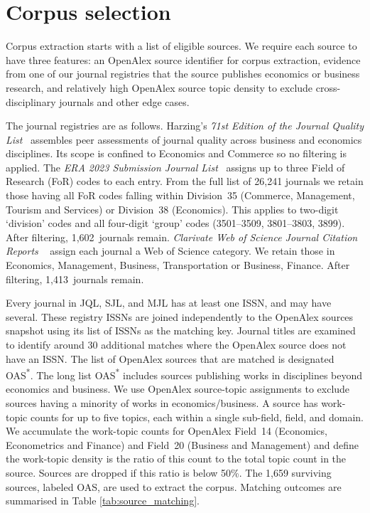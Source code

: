 \section{Corpus selection}
\label{sec:sources}

Corpus extraction starts with a list of eligible sources. We require each source to have three features: an OpenAlex source identifier for corpus extraction, evidence from one of our journal registries that the source 
publishes economics or business research, and relatively high OpenAlex source topic density to exclude cross-disciplinary journals and other edge cases.

The journal registries are as follows. Harzing's \textit{71st Edition of the Journal Quality List}~\cite[][JQL]{harzinga.-w.JournalQualityList2024} assembles
peer assessments of journal quality across business and economics
disciplines. Its scope is confined to Economics and Commerce so no
filtering is applied.
The \textit{ERA 2023 Submission Journal List}~\cite[][SJL]{australianresearchcouncilERA2023Submission2022} assigns up to three
Field of Research (FoR) codes to each entry. From the full list 
of 26,241 journals we retain those having all FoR codes falling within 
Division~35 (Commerce, Management, Tourism and
Services) or Division~38 (Economics). This applies to two-digit `division' codes and all four-digit `group' codes (3501--3509, 3801--3803, 3899).
After filtering, 1,602~journals remain.
\textit{Clarivate Web of Science Journal Citation Reports} ~\cite[][JCR]{clarivateanalyticsJournalCitationReports2026} assign each
journal a Web of Science category. We retain those in Economics, Management, Business, Transportation or Business, Finance. After filtering, 1,413~journals remain.

Every journal in JQL, SJL, and MJL has at least one ISSN, and may have several. These registry ISSNs are joined independently to the OpenAlex sources snapshot using its list of ISSNs as the matching key. Journal titles are examined to identify around 30 additional matches where the OpenAlex source does not have an ISSN. The list of OpenAlex sources that are matched is designated OAS\textsuperscript{*}. The long list OAS\textsuperscript{*} includes sources publishing works in disciplines beyond  economics and business. We use OpenAlex source-topic assignments to exclude sources having a minority of works in economics/business. A source has work-topic counts for up to five topics, each within a single sub-field, field, and domain. We accumulate the work-topic counts for OpenAlex Field~14 (Economics, Econometrics and Finance) and Field~20 (Business and Management) and define the work-topic density is the ratio of this count to the total topic count in the source. Sources are dropped if this ratio is below 50\%. The 1,659 surviving sources, labeled OAS, are used to extract the corpus. Matching outcomes are summarised in Table \ref{tab:source_matching}.

